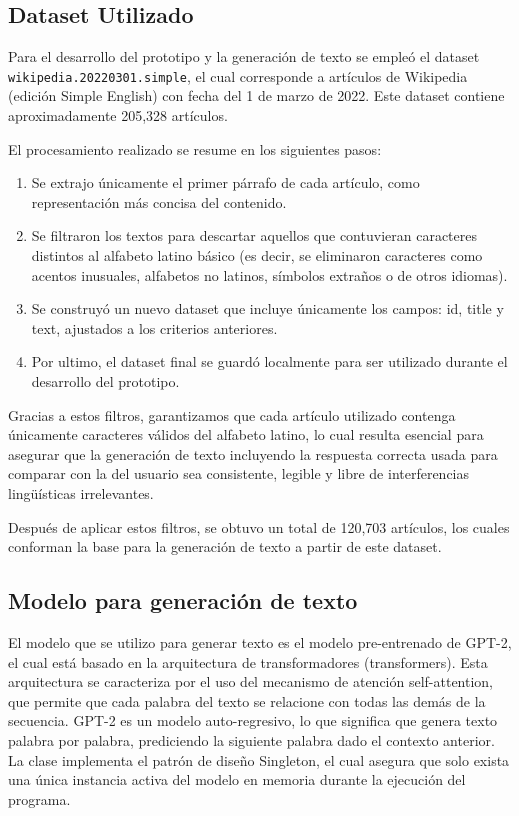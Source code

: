 \subsection{Dataset Utilizado}

Para el desarrollo del prototipo y la generación de texto se empleó el dataset \texttt{wikipedia.20220301.simple}, el cual corresponde a artículos de Wikipedia (edición Simple English) con fecha del 1 de marzo de 2022. Este dataset contiene aproximadamente 205,328 artículos.

El procesamiento realizado se resume en los siguientes pasos:

\begin{enumerate}
  \item Se extrajo únicamente el primer párrafo de cada artículo, como representación más concisa del contenido.
  \item Se filtraron los textos para  descartar aquellos que contuvieran caracteres distintos al alfabeto latino básico (es decir, se eliminaron caracteres como acentos inusuales, alfabetos no latinos, símbolos extraños o de otros idiomas).
  \item Se construyó un nuevo dataset que incluye únicamente los campos: id, title y text, ajustados a los criterios anteriores.
  \item Por ultimo, el dataset final se guardó localmente para ser utilizado durante el desarrollo del prototipo.
\end{enumerate}

Gracias a estos filtros, garantizamos que cada artículo utilizado contenga únicamente caracteres válidos del alfabeto latino, lo cual resulta esencial para asegurar que la generación de texto incluyendo la respuesta correcta usada para comparar con la del usuario sea consistente, legible y libre de interferencias lingüísticas irrelevantes.

Después de aplicar estos filtros, se obtuvo un total de  120,703 artículos, los cuales conforman la base para la generación de texto a partir de este dataset.


\subsection{Modelo para generación de texto}
El modelo que se utilizo para generar texto es el modelo pre-entrenado de GPT-2, el cual está basado en la arquitectura de transformadores (transformers). Esta arquitectura se caracteriza por el uso del mecanismo de atención self-attention, que permite que cada palabra del texto se relacione con todas las demás de la secuencia. GPT-2 es un modelo auto-regresivo, lo que significa que genera texto palabra por palabra, prediciendo la siguiente palabra dado el contexto anterior. La clase implementa el patrón de diseño Singleton, el cual asegura que solo exista una única instancia activa del modelo en memoria durante la ejecución del programa.

